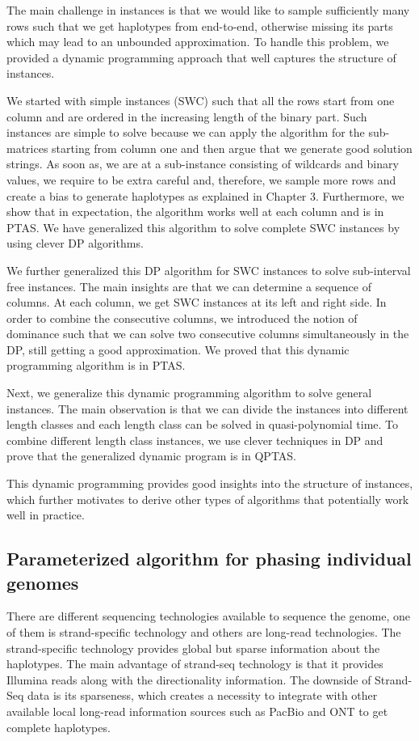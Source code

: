 The main challenge in \GMEC instances is that we would like to sample sufficiently many rows such that we get haplotypes from end-to-end, otherwise missing its parts which may lead to an unbounded approximation.
To handle this problem, we provided a dynamic programming approach that well captures the structure of instances.

We started with simple instances (SWC) such that all the rows start from one column and are ordered in the increasing length of the binary part.
Such instances are simple to solve because we can apply the \BMEC algorithm for the sub-matrices starting from column one and then argue that we generate good solution strings.
As soon as, we are at a sub-instance consisting of wildcards and binary values, we require to be extra careful and, therefore, we sample more rows and create a bias to generate haplotypes as explained in Chapter 3.
Furthermore, we show that in expectation, the algorithm works well at each column and is in PTAS. 
We have generalized this algorithm to solve complete SWC instances by using clever DP algorithms.

We further generalized this DP algorithm for SWC instances to solve sub-interval free instances. 
The main insights are that we can determine a sequence of columns. At each column, we get SWC instances at its left and right side.
In order to combine the consecutive columns, we introduced the notion of dominance such that we can solve two consecutive columns simultaneously in the DP, still getting a good approximation.
We proved that this dynamic programming algorithm is in PTAS.

Next, we generalize this dynamic programming algorithm to solve general \GMEC instances. 
The main observation is that we can divide the instances into different length classes and each length class can be solved in quasi-polynomial time.
To combine different length class instances, we use clever techniques in DP and prove that the generalized dynamic program is in QPTAS.

This dynamic programming provides good insights into the structure of instances, which further motivates to derive other types of algorithms that potentially work well in practice.

\subsection{Parameterized algorithm for phasing individual genomes}
There are different sequencing technologies available to sequence the genome, one of them is strand-specific technology and others are long-read technologies.
The strand-specific technology provides global but sparse information about the haplotypes. The main advantage of strand-seq technology is that it provides Illumina reads along with the directionality information.
The downside of Strand-Seq data is its sparseness, which creates a necessity to integrate with other available local long-read information sources such as PacBio and ONT to get complete haplotypes.

